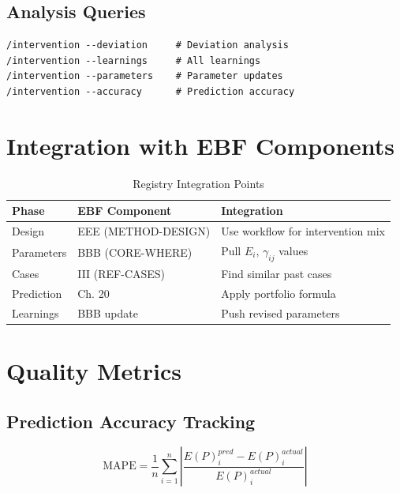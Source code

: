 \subsection{Analysis Queries}

\begin{verbatim}
/intervention --deviation     # Deviation analysis
/intervention --learnings     # All learnings
/intervention --parameters    # Parameter updates
/intervention --accuracy      # Prediction accuracy
\end{verbatim}

\section{Integration with EBF Components}

\begin{table}[h]
\centering
\begin{tabular}{lll}
\toprule
\textbf{Phase} & \textbf{EBF Component} & \textbf{Integration} \\
\midrule
Design & EEE (METHOD-DESIGN) & Use workflow for intervention mix \\
Parameters & BBB (CORE-WHERE) & Pull $E_i$, $\gamma_{ij}$ values \\
Cases & III (REF-CASES) & Find similar past cases \\
Prediction & Ch. 20 & Apply portfolio formula \\
Learnings & BBB update & Push revised parameters \\
\bottomrule
\end{tabular}
\caption{Registry Integration Points}
\end{table}

\section{Quality Metrics}

\subsection{Prediction Accuracy Tracking}

\begin{equation}
\text{MAPE} = \frac{1}{n} \sum_{i=1}^{n} \left| \frac{E(P)_i^{pred} - E(P)_i^{actual}}{E(P)_i^{actual}} \right|
\end{equation}

